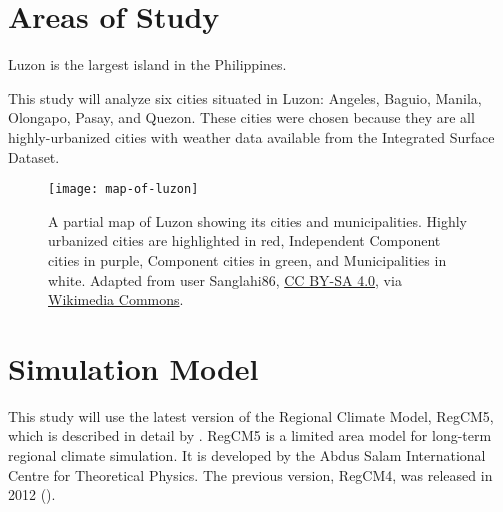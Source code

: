 \section{Areas of Study}
	Luzon is the largest island in the Philippines.
	
	This study will analyze six cities situated in Luzon:
		Angeles,
		Baguio,
		Manila,
		Olongapo,
		Pasay,
		and
		Quezon.
	These cities were chosen because they are all highly-urbanized cities with weather data available from the Integrated Surface Dataset.

	
	\begin{figure}
		\centering
		\texttt{[image: map-of-luzon]}
		\caption{
			A partial map of Luzon showing its cities and municipalities.
			Highly urbanized cities are highlighted in red,
				Independent Component cities in purple,
				Component cities in green, and
				Municipalities in white.
			Adapted from user Sanglahi86, 	
				\href{https://creativecommons.org/licenses/by-sa/4.0}{CC BY-SA 4.0},
				via \href{https://commons.wikimedia.org/wiki/File:Cities_and_municipalities_of_the_Philippines.png}{Wikimedia Commons}.
		}
		\label{fig:map-of-metro-manila}
	\end{figure}	
		
\section{Simulation Model}
	This study will use the latest version of the Regional Climate Model, RegCM5, which is described in detail by \textcite{Giorgi2023}.
	RegCM5 is a limited area model for long-term regional climate simulation.
	It is developed by the Abdus Salam International Centre for Theoretical Physics.
	The previous version, RegCM4, was released in 2012 (\cite{Giorgi2012}).
	
